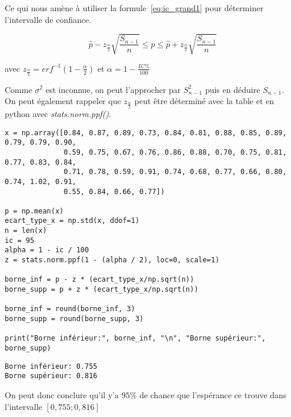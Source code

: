 \noindent
Ce qui nous amène à utiliser la formule~\ref*{eq:ic_grand1} pour déterminer l'intervalle de confiance.

\begin{equation}
    \hat{p} - z_{\frac{\alpha}{2}} \sqrt{\frac{S_{n-1}}{n}} \leq p \leq \hat{p} + z_{\frac{\alpha}{2}} \sqrt{\frac{S_{n-1}}{n}}
    \label{eq:ic_grand1}
\end{equation}

\begin{center}
    avec \qquad $z_{\frac{\alpha}{2}}=erf^{-1}(1 - \frac{\alpha}{2})$ \qquad et \qquad $\alpha = 1- \frac{IC\%}{100}$
\end{center}

\noindent
Comme $\sigma^{2}$ est inconnue, on peut l'approcher par $S_{n-1}^{2}$ puis en déduire $S_{n-1}$. \\
On peut également rappeler que $z_{\frac{\alpha}{2}}$ peut être déterminé avec la table et en python avec \textit{stats.norm.ppf()}.

\vspace{.2cm}

\begin{lstlisting}[style=myPython, caption=Code Python question 2, frame=lines]
x = np.array([0.84, 0.87, 0.89, 0.73, 0.84, 0.81, 0.88, 0.85, 0.89, 0.79, 0.79, 0.90,
              0.59, 0.75, 0.67, 0.76, 0.86, 0.88, 0.70, 0.75, 0.81, 0.77, 0.83, 0.84, 
              0.71, 0.78, 0.59, 0.91, 0.74, 0.68, 0.77, 0.66, 0.80, 0.74, 1.02, 0.91,
              0.55, 0.84, 0.66, 0.77])

p = np.mean(x)
ecart_type_x = np.std(x, ddof=1)
n = len(x)
ic = 95
alpha = 1 - ic / 100
z = stats.norm.ppf(1 - (alpha / 2), loc=0, scale=1)

borne_inf = p - z * (ecart_type_x/np.sqrt(n))
borne_supp = p + z * (ecart_type_x/np.sqrt(n))

borne_inf = round(borne_inf, 3)
borne_supp = round(borne_supp, 3)

print("Borne inférieur:", borne_inf, "\n", "Borne supérieur:", borne_supp)
\end{lstlisting}

\begin{lstlisting}[style=myLog, caption=Résultat du code, frame=lines]
Borne inférieur: 0.755 
Borne supérieur: 0.816
\end{lstlisting}


\noindent
On peut donc conclure qu'il y'a $95\%$ de chance que l'espérance ce trouve dans l'intervalle $[0,755; 0,816]$

\vspace{.5cm}


